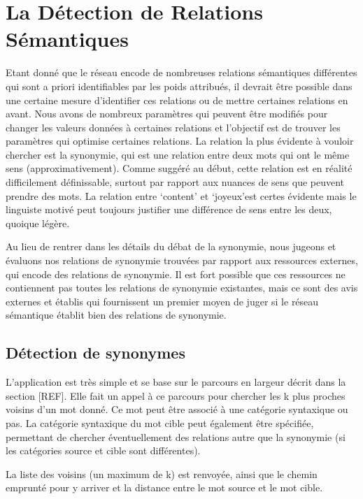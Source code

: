 \section{La Détection de Relations Sémantiques}

Etant donné que le réseau encode de nombreuses relations sémantiques 
différentes qui sont a priori identifiables par les poids attribués, il devrait 
être possible dans une certaine mesure d'identifier ces relations ou de mettre 
certaines relations en avant. Nous avons de nombreux paramètres qui peuvent être 
modifiés pour changer les valeurs données à certaines relations et l'objectif 
est de trouver les paramètres qui optimise certaines relations. La relation la 
plus évidente à vouloir chercher est la synonymie, qui est une relation 
entre deux mots qui ont le même sens (approximativement). Comme suggéré au 
début, cette relation est en réalité difficilement définissable, surtout par 
rapport aux nuances de sens que peuvent prendre des mots. La relation entre 
\lq{content}\rq{} et \lq{joyeux}\rq est certes évidente mais le linguiste motivé 
peut toujours justifier une différence de sens entre les deux, quoique légère.

Au lieu de rentrer dans les détails du débat de la synonymie, nous jugeons et 
évaluons nos relations de synonymie trouvées par rapport aux ressources 
externes, qui encode des relations de synonymie. Il est fort possible que ces 
ressources ne contiennent pas toutes les relations de synonymie existantes, mais 
ce sont des avis externes et établis qui fournissent un premier moyen de juger 
si le réseau sémantique établit bien des relations de synonymie.

\subsection{Détection de synonymes}

L'application est très simple et se base sur le parcours en largeur décrit dans 
la section [REF]. Elle fait un appel à ce parcours pour chercher les k plus 
proches voisins d'un mot donné. Ce mot peut être associé à une catégorie 
syntaxique ou pas. La catégorie syntaxique du mot cible peut également être 
spécifiée, permettant de chercher éventuellement des relations autre que la 
synonymie (si les catégories source et cible sont différentes).

La liste des voisins (un maximum de k) est renvoyée, ainsi que le chemin 
emprunté pour y arriver et la distance entre le mot source et le mot cible.

